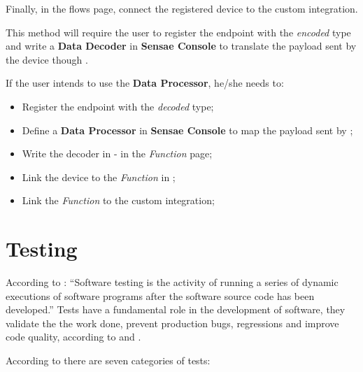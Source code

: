 Finally, in the  flows page, connect the registered device to the custom integration.

This method will require the user to register the endpoint with the \textit{encoded} type and write a \textbf{Data Decoder} in \textbf{Sensae Console} to translate the payload sent by the device though .

If the user intends to use the \textbf{Data Processor}, he/she needs to:

\begin{itemize}
    \item Register the endpoint with the \textit{decoded} type;
    \item Define a \textbf{Data Processor} in \textbf{Sensae Console} to map the payload sent by ;
    \item Write the decoder in  - in the \textit{Function} page;
    \item Link the device to the \textit{Function} in ;
    \item Link the \textit{Function} to the custom integration;
\end{itemize}

\section{Testing}
\label{sec:implementation:testing}

According to \cite{booktest}: ``Software testing is the activity of running a series of dynamic executions of software programs after the software source code has been developed.''
Tests have a fundamental role in the development of software, they validate the the work done, prevent production bugs, regressions and improve code quality, according to \cite{linuxtest} and \cite{imbtest}.

According to \cite{typetest} there are seven categories of tests:

